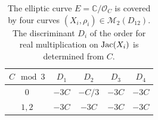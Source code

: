 \documentclass[a4paper,11pt]{amsart}
\numberwithin{equation}{section}
\numberwithin{figure}{section}
\numberwithin{table}{section}
\newcommand{\C}{\mathbb{C}}
\DeclareMathOperator{\Jac}{{\rm{Jac}}}
\begin{document}
\begin{table}[H]
    \centering
    \begin{tabular}{|c|c|c|c|c|}
        \hline
        $C\!\!\mod 3$ & $D_1$ & $D_2$ & $D_3$ & $D_4$ \\
        \hline
        $0$ & $-3C$ & $-C/3$ & $-3C$ & $-3C$ \\
        $1,2$ & $-3C$ & $-3C$ & $-3C$ & $-3C$ \\
        \hline
    \end{tabular}
    \vspace{5pt}
    \caption{The elliptic curve $E= \C/\mathcal{O}_C$ is covered by four curves $(X_i,\rho_i)\in\mathcal{M}_{2}(D_{12})$. The discriminant $D_i$ of the order for real multiplication on $\Jac(X_i)$ is determined from $C$.}
    \label{tab:discriminants}
\end{table}
\end{document}
